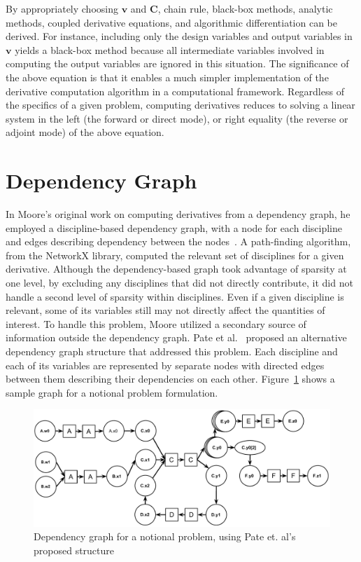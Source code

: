 \documentclass[]{aiaa-tc} %
\begin{document}
    By appropriately choosing $\bm v$ and $\bm C$, chain rule, black-box methods, analytic methods, coupled derivative equations, and algorithmic differentiation can be derived.
    For instance, including only the design variables and output variables in $\bm v$ yields a black-box method because all intermediate variables involved in computing the output variables are ignored in this situation.
    The significance of the above equation is that it enables a much simpler implementation of the derivative computation algorithm in a computational framework.
    Regardless of the specifics of a given problem, computing derivatives reduces to solving a linear system in the left (the forward or direct mode), or right equality (the reverse or adjoint mode) of the above equation.


  \section{Dependency Graph}\label{section:depgraph}

    In Moore's original work on computing derivatives from a dependency graph, he employed
    a discipline-based dependency graph, with a node for each discipline and edges describing
    dependency between the nodes~\cite{openmdao_derivatives}. A path-finding algorithm, from the NetworkX library\cite{hagberg-2008-exploring},
    computed the relevant set of disciplines for a given derivative. Although the dependency-based graph took advantage of sparsity at
    one level, by excluding any disciplines that did not directly contribute, it did not handle a second level of sparsity
    within disciplines. Even if a given discipline is relevant, some of its variables still may not
    directly affect the quantities of interest. To handle this problem, Moore utilized a secondary source of information
    outside the dependency graph. Pate et al.~\cite{graph_problem2013} proposed an alternative dependency graph
    structure that addressed this problem. Each discipline and each of its variables are
    represented by separate nodes with directed edges between them describing their dependencies on each other.
    Figure~\ref{fig:sample_graph_full} shows a sample graph for a notional problem formulation.

    \begin{figure}[!htb]\begin{center}
      \includegraphics[width=.8\textwidth]{images/sample_graph_full}
      \caption{ Dependency graph for a notional problem, using Pate et. al's proposed structure\label{fig:sample_graph_full}}
    \end{center}\end{figure}
\end{document}
